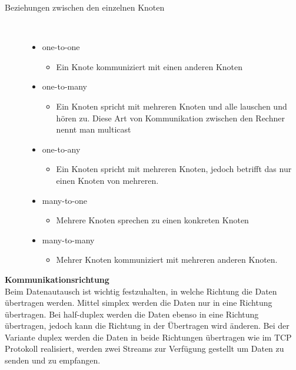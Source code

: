 \documentclass[a4paper,12pt]{article}
\begin{document}
\begin{description}
    \item[Beziehungen zwischen den einzelnen Knoten] ~\par
    \begin{itemize}
        \item one-to-one
        \begin{itemize}
            \item{Ein Knote kommuniziert mit einen anderen Knoten}
        \end{itemize}
        \item one-to-many
        \begin{itemize}
            \item{Ein Knoten spricht mit mehreren Knoten und alle lauschen und hören zu. Diese Art von Kommunikation zwischen den Rechner nennt man multicast}
        \end{itemize}
        \item one-to-any
        \begin{itemize}
            \item{Ein Knoten spricht mit mehreren Knoten, jedoch betrifft das nur einen Knoten von mehreren.}
        \end{itemize}
        \item many-to-one
        \begin{itemize}
            \item{Mehrere Knoten sprechen zu einen konkreten Knoten}
        \end{itemize}
        \item many-to-many
        \begin{itemize}
            \item{Mehrer Knoten kommuniziert mit mehreren anderen Knoten.\\}
        \end{itemize}
    \end{itemize} 
\end{description}
\textbf{Kommunikationsrichtung\\}
Beim Datenautausch ist wichtig festzuhalten, in welche Richtung die Daten übertragen werden. Mittel simplex werden die Daten nur in eine Richtung übertragen. 
Bei half-duplex werden die Daten ebenso in eine Richtung übertragen, jedoch kann die Richtung in der Übertragen wird änderen. Bei der Variante duplex werden die Daten in beide Richtungen übertragen wie im TCP Protokoll realisiert, werden zwei Streams
zur Verfügung gestellt um Daten zu senden und zu empfangen.
\end{document}
